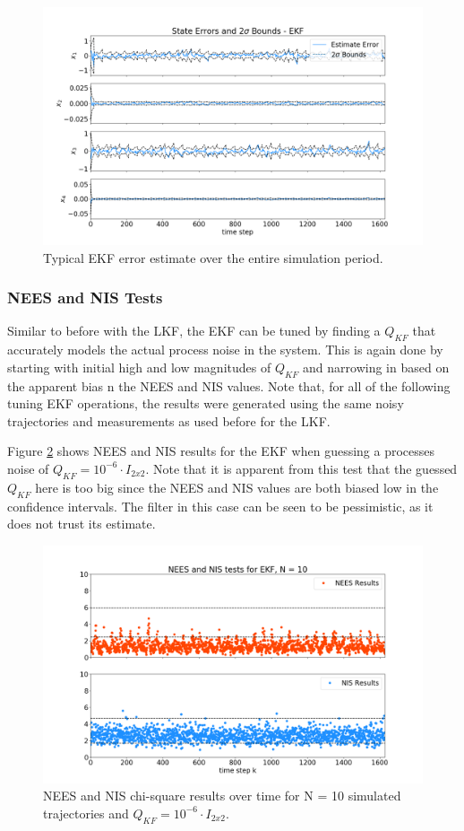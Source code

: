 \documentclass[11pt, a4paper]{article}
\begin{document}
\begin{figure}[H]
	\centering
	\includegraphics[width=\textwidth]{Figures/ekf_estimate_th.png}
	\caption{Typical EKF error estimate over the entire simulation period.}
	\label{fig:ekf_est}
\end{figure}


\subsubsection{NEES and NIS Tests}
Similar to before with the LKF, the EKF can be tuned by finding a $Q_{KF}$ that accurately models the actual process noise in the system. 
This is again done by starting with initial high and low magnitudes of $Q_{KF}$ and narrowing in based on the apparent bias n the NEES and NIS values. 
Note that, for all of the following tuning EKF operations, the results were generated using the same noisy trajectories and measurements as used before for the LKF. 

Figure \ref{fig:neesnis_ekf_Qbig} shows NEES and NIS results for the EKF when guessing a processes noise of $Q_{KF} = 10^{-6} \cdot I_{2 x 2}$. 
Note that it is apparent from this test that the guessed $Q_{KF}$ here is too big since the NEES and NIS values are both biased low in the confidence intervals. 
The filter in this case can be seen to be pessimistic, as it does not trust its estimate. 
\begin{figure}[H]
	\centering
	\includegraphics[width=\textwidth]{./Figures/NEESNIS_ekf_N10Q1.0E-06.png}
	\caption{NEES and NIS chi-square results over time for N = 10 simulated trajectories and $Q_{KF} = 10^{-6} \cdot I_{2 x 2}$.}
	\label{fig:neesnis_ekf_Qbig}
\end{figure}
\end{document}
